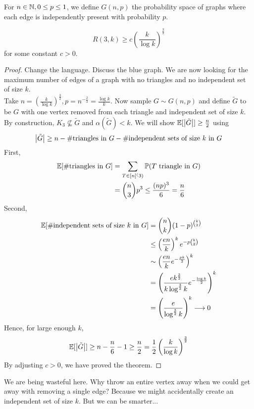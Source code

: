 \documentclass{article}
\begin{document}
\begin{defi}
  For $n \in \mathbb N, 0 \le p \le 1$, we define $G(n, p)$ the probability space of graphs where each edge is independently present with probability $p$.
\end{defi}

\begin{thm}[Erd\H os]
  $$R(3, k) \ge c\left(\frac k{\log k}\right)^{\frac 32}$$
  for some constant $c > 0$.
\end{thm}
\begin{proof}
  Change the language. Discuss the blue graph. We are now looking for the maximum number of edges of a graph with no triangles and no independent set of size $k$. \\
  Take $n = \left(\frac k{\log k}\right)^{\frac 32}, p = n^{-\frac 23} = \frac{\log k}k$. Now sample $G \sim G(n, p)$ and define $\tilde G$ to be $G$ with one vertex removed from each triangle and independent set of size $k$. By construction, $K_3 \not\subseteq \tilde G$ and $\alpha(\tilde G) < k$. We will show $\mathbb E[\left\lvert \tilde G\right\rvert] \ge \frac n2$ using
  $$\left\lvert \tilde G\right\rvert \ge n - \#\text{triangles in } G - \#\text{independent sets of size $k$ in } G$$
  First,
  \begin{align*}
    \mathbb E[\#\text{triangles in } G]
    & = \sum_{T \in [n]^(3)} \mathbb P(T \text { triangle in } G) \\
    & = \binom n3 p^3 \le \frac{(np)^3}6 = \frac n6
  \end{align*}
  Second,
  \begin{align*}
    \mathbb E[\#\text{independent sets of size $k$ in } G]
    & = \binom nk (1 - p)^{\binom k2} \\
    & \le \left(\frac{en}k\right)^k e^{-p\binom k2} \\
    & \sim \left(\frac{en}k e^{-\frac{pk}2}\right)^k \\
    & = \left(\frac{ek^{\frac 32}}{k\log^{\frac 32} k} e^{-\frac{\log k}2}\right)^k \\
    & = \left(\frac e{\log^{\frac 32} k}\right)^k \longrightarrow 0
  \end{align*}
  Hence, for large enough $k$,
  $$\mathbb E[\left\lvert \tilde G\right\rvert] \ge n - \frac n6 - 1 \ge \frac n2 = \frac 12 \left(\frac k{\log k}\right)^{\frac 32}$$
  By adjusting $c > 0$, we have proved the theorem.
\end{proof}

We are being wasteful here. Why throw an entire vertex away when we could get away with removing a single edge? Because we might accidentally create an independent set of size $k$. But we can be smarter...
\end{document}
